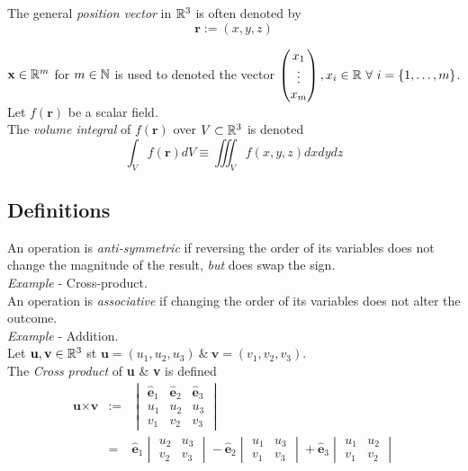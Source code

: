 \documentclass[11pt,a4paper]{article}
\begin{document}
The general \textit{position vector} in $\mathbb{R}^3$ is often denoted by
$$\textbf{r}:=(x,y,z)$$

$\textbf{x} \in \mathbb{R}^m$ for $m \in \mathbb{N}$ is used to denoted the vector $\begin{pmatrix} x_1 \\ \vdots \\ x_m \end{pmatrix}, x_i \in \mathbb{R}\ \forall\ i = \{1, \dots, m\}$.\\

Let $f(\textbf{r})$ be a scalar field.\\
The \textit{volume integral} of $f(\textbf{r})$ over $V\subset\mathbb{R}^3$ is denoted
$$\int_Vf(\textbf{r})dV\equiv\iiint_Vf(x,y,z)dxdydz$$

\subsection{Definitions}

An operation is \textit{anti-symmetric} if reversing the order of its variables does not change the magnitude of the result, \textit{but} does swap the sign.\\
\textit{Example} - Cross-product.\\

An operation is \textit{associative} if changing the order of its variables does not alter the outcome.\\
\textit{Example} - Addition.\\

Let $\textbf{u}, \textbf{v} \in\mathbb{R}^3$ st $\textbf{u} = (u_1, u_2, u_3)\ \&\ \textbf{v}=(v_1, v_2, v_3)$.\\
The \textit{Cross product} of \textbf{u} \& \textbf{v} is defined
\[\begin{array}{rcl}
\textbf{u}\times\textbf{v}&:=&\begin{vmatrix}\hat{\textbf{e}}_1 & \hat{\textbf{e}}_2 & \hat{\textbf{e}}_3 \\ u_1 & u_2 & u_3 \\ v_1 & v_2 & v_3 \end{vmatrix}\\
&=&\hat{\textbf{e}}_1\begin{vmatrix} u_2 & u_3 \\ v_2 & v_3\end{vmatrix} - \hat{\textbf{e}}_2\begin{vmatrix} u_1 & u_3 \\ v_1 & v_3\end{vmatrix} + \hat{\textbf{e}}_3\begin{vmatrix} u_1 & u_2 \\ v_1 & v_2\end{vmatrix}\end{array}\]
\end{document}
